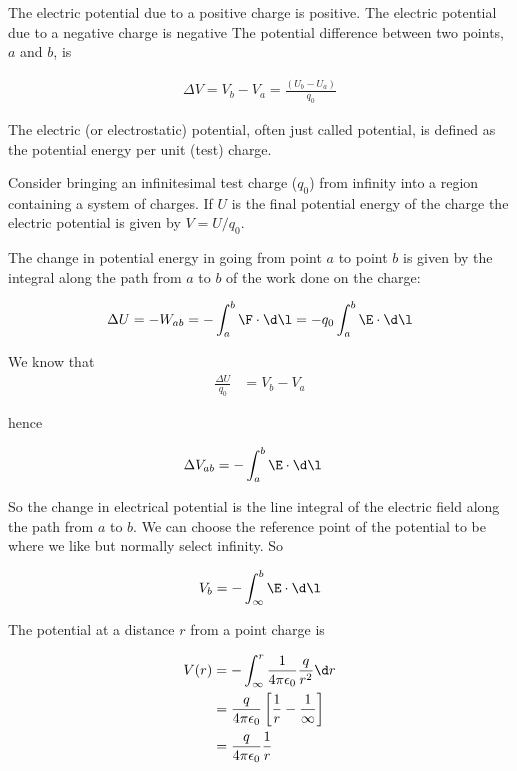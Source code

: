 \documentclass[
]{book}
\begin{document}
The electric potential due to a positive charge is positive. The
electric potential due to a negative charge is negative The potential
difference between two points, \(a\) and \(b\), is

\[\begin{aligned}
\Delta V = V_b - V_a =\frac{(U_b - U_a)}{q_0}   
\end{aligned}\]

The electric (or electrostatic) potential, often just called potential,
is defined as the potential energy per unit (test) charge.

Consider bringing an infinitesimal test charge (\(q_0\)) from infinity
into a region containing a system of charges. If \(U\) is the final
potential energy of the charge the electric potential is given by
\(V = U/q_0\).

The change in potential energy in going from point \(a\) to point \(b\) is
given by the integral along the path from \(a\) to \(b\) of the work done on
the charge:

\[\begin{aligned}
\Delta U = - W_{ab} = -\int_a^b \F \cdot \d\l = -q_0 \int_a^b \E \cdot \d\l
\end{aligned}\]

We know that \[\begin{aligned}
\frac{\Delta U}{q_0} &= V_b - V_a
\end{aligned}\]

hence

\[\begin{aligned}
\Delta V_{ab} &= -\int_a^b \E \cdot \d\l
\end{aligned}\]

So the change in electrical potential is the line integral of the
electric field along the path from \(a\) to \(b\). We can choose the
reference point of the potential to be where we like but normally select
infinity. So

\[\begin{aligned}
V_b = -\int_\infty^b \E \cdot \d\l
\end{aligned}\]

The potential at a distance \(r\) from a point charge is

\[\begin{aligned}
V(r) &= -\int_\infty^r \frac{1}{4\pi\epsilon_0} \frac{q}{r^2} \d r \\
     &= \frac{q}{4\pi\epsilon_0} \left[ \frac{1}{r} - \frac{1}{\infty} \right] \\
     &= \frac{q}{4\pi\epsilon_0} \frac{1}{r}
\end{aligned}\]
\end{document}
